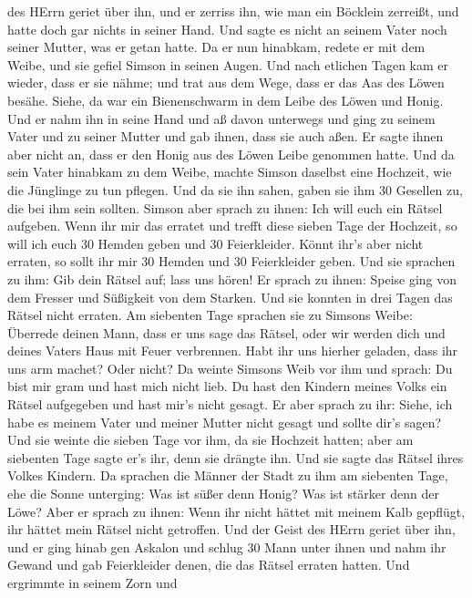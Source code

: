 des HErrn geriet über ihn, und er zerriss ihn, wie man ein Böcklein
zerreißt, und hatte doch gar nichts in seiner Hand. Und sagte es nicht
an seinem Vater noch seiner Mutter, was er getan hatte.  Da
er nun hinabkam, redete er mit dem Weibe, und sie gefiel Simson in
seinen Augen.  Und nach etlichen Tagen kam er wieder, dass
er sie nähme; und trat aus dem Wege, dass er das Aas des Löwen besähe.
Siehe, da war ein Bienenschwarm in dem Leibe des Löwen und Honig.
 Und er nahm ihn in seine Hand und aß davon unterwegs und
ging zu seinem Vater und zu seiner Mutter und gab ihnen, dass sie auch
aßen. Er sagte ihnen aber nicht an, dass er den Honig aus des Löwen
Leibe genommen hatte.  Und da sein Vater hinabkam zu dem
Weibe, machte Simson daselbst eine Hochzeit, wie die Jünglinge zu tun
pflegen.  Und da sie ihn sahen, gaben sie ihm 30 Gesellen
zu, die bei ihm sein sollten.  Simson aber sprach zu ihnen:
Ich will euch ein Rätsel aufgeben. Wenn ihr mir das erratet und trefft
diese sieben Tage der Hochzeit, so will ich euch 30 Hemden geben und 30
Feierkleider.  Könnt ihr's aber nicht erraten, so sollt ihr
mir 30 Hemden und 30 Feierkleider geben. Und sie sprachen zu ihm: Gib
dein Rätsel auf; lass uns hören!  Er sprach zu ihnen:
Speise ging von dem Fresser und Süßigkeit von dem Starken. Und sie
konnten in drei Tagen das Rätsel nicht erraten.  Am
siebenten Tage sprachen sie zu Simsons Weibe: Überrede deinen Mann, dass
er uns sage das Rätsel, oder wir werden dich und deines Vaters Haus mit
Feuer verbrennen. Habt ihr uns hierher geladen, dass ihr uns arm machet?
Oder nicht?  Da weinte Simsons Weib vor ihm und sprach: Du
bist mir gram und hast mich nicht lieb. Du hast den Kindern meines Volks
ein Rätsel aufgegeben und hast mir's nicht gesagt. Er aber sprach zu
ihr: Siehe, ich habe es meinem Vater und meiner Mutter nicht gesagt und
sollte dir's sagen?  Und sie weinte die sieben Tage vor
ihm, da sie Hochzeit hatten; aber am siebenten Tage sagte er's ihr, denn
sie drängte ihn. Und sie sagte das Rätsel ihres Volkes Kindern.
 Da sprachen die Männer der Stadt zu ihm am siebenten Tage,
ehe die Sonne unterging: Was ist süßer denn Honig? Was ist stärker denn
der Löwe? Aber er sprach zu ihnen: Wenn ihr nicht hättet mit meinem Kalb
gepflügt, ihr hättet mein Rätsel nicht getroffen.  Und der
Geist des HErrn geriet über ihn, und er ging hinab gen Askalon und
schlug 30 Mann unter ihnen und nahm ihr Gewand und gab Feierkleider
denen, die das Rätsel erraten hatten. Und ergrimmte in seinem Zorn und

